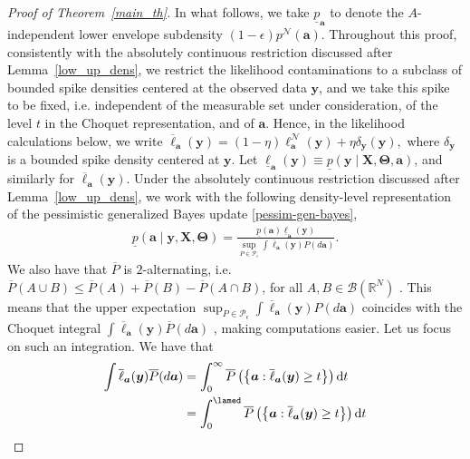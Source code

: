 \documentclass[12pt, english, oneside, a4paper]{article}
\newcommand{\y}{\boldsymbol{y}}
\newcommand{\X}{\boldsymbol{X}}
\renewcommand{\a}{\boldsymbol{a}}
\newcommand{\bT}{\boldsymbol{\Theta}}
\begin{document}
\begin{proof}[Proof of Theorem~\ref{main_th}]
    In what follows, we take $\underline{p}_{\a}$ to denote the $A$-independent lower envelope subdensity $(1-\epsilon)p^\mathcal{N}(\a)$. Throughout this proof, consistently with the absolutely continuous restriction discussed after Lemma~\ref{low_up_dens}, we restrict the likelihood contaminations to a subclass of bounded spike densities centered at the observed data $\mathbf y$, and we take this spike to be fixed, i.e. independent of the measurable set under consideration, of the level $t$ in the Choquet representation, and of $\a$. Hence, in the likelihood calculations below, we write
\(
\overline{\ell}_{\a}(\y)=(1-\eta)\ell^\mathcal{N}_{\a}(\y)+\eta \delta_{\mathbf y}(\y),
\)
where $\delta_{\mathbf y}$ is a bounded spike density centered at $\mathbf y$. Let $\underline{\ell}_{\a}(\y) \equiv \underline{p}(\y \mid \X,\bT,\a)$, and similarly for $\overline{\ell}_{\a}(\y)$. Under the absolutely continuous restriction discussed after Lemma~\ref{low_up_dens}, we work with the following density-level representation of the pessimistic generalized Bayes update \eqref{pessim-gen-bayes},
    \begin{align}\label{gen-bayes}
        \underline{p}(\a \mid \y, \X,\bT)=\frac{\underline{p}(\a) \underline{\ell}_{\a}(\y)}{\sup_{P\in\mathcal{P}_\epsilon} \int \overline{\ell}_{\a}(\y) P(d\a)}.
    \end{align}
    We also have that 
    $\overline{P}$ 
    is $2$-alternating, i.e. $\overline{P}(A \cup B) \leq \overline{P}(A)+\overline{P}(B)-\overline{P}(A \cap B)$, for all $A,B \in \mathcal{B}(\mathbb{R}^N)$ \citep{wasserman,novel_Bayes}. This means that the upper expectation $\sup_{P\in\mathcal{P}_\epsilon} \int \overline{\ell}_{\a}(\y) P(d\a)$ coincides with the Choquet integral $\int \overline{\ell}_{\a}(\y) \overline{P}(d\a)$ \citep{cerreia}, making computations easier. Let us focus on such an integration. We have that
    \begin{align}
        \int \overline{\ell}_{\a}(\y) \overline{P}(d\a) &= \int_0^\infty \overline{P} \left( \left\lbrace{\a : \overline{\ell}_{\a}(\y) \geq t}\right\rbrace \right) \text{d}t \label{first_deriv}\\
        &= \int_0^\lamed \overline{P} \left( \left\lbrace{\a : \overline{\ell}_{\a}(\y) \geq t}\right\rbrace \right) \text{d}t \label{second_deriv}\\

\end{align}
\end{proof}
\end{document}
